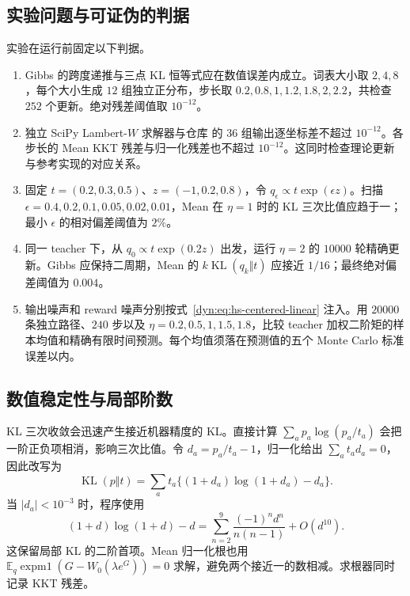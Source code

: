 \documentclass[lang=cn,scheme=chinese,openany]{../book/elegantbook}
\newcommand{\E}{\mathbb E}
\newcommand{\KL}{\operatorname{KL}}
\begin{document}
\subsection{实验问题与可证伪的判据}

实验在运行前固定以下判据。
\begin{enumerate}
 \item Gibbs 的跨度递推与三点 KL 恒等式应在数值误差内成立。词表大小取 $2,4,8$，每个大小生成 $12$ 组独立正分布，步长取 $0.2,0.8,1,1.2,1.8,2,2.2$，共检查 $252$ 个更新。绝对残差阈值取 $10^{-12}$。
 \item 独立 SciPy Lambert-$W$ 求解器与仓库  的 $36$ 组输出逐坐标差不超过 $10^{-12}$。各步长的 Mean KKT 残差与归一化残差也不超过 $10^{-12}$。这同时检查理论更新与参考实现的对应关系。
 \item 固定 $t=(0.2,0.3,0.5)$、$z=(-1,0.2,0.8)$，令 $q_\epsilon\propto t\exp(\epsilon z)$。扫描 $\epsilon=0.4,0.2,0.1,0.05,0.02,0.01$，Mean 在 $\eta=1$ 时的 KL 三次比值应趋于一；最小 $\epsilon$ 的相对偏差阈值为 $2\%$。
 \item 同一 teacher 下，从 $q_0\propto t\exp(0.2z)$ 出发，运行 $\eta=2$ 的 $10000$ 轮精确更新。Gibbs 应保持二周期，Mean 的 $k\KL(q_k\Vert t)$ 应接近 $1/16$；最终绝对偏差阈值为 $0.004$。
 \item 输出噪声和 reward 噪声分别按式~\eqref{dyn:eq:hs-centered-linear} 注入。用 $20000$ 条独立路径、$240$ 步以及 $\eta=0.2,0.5,1,1.5,1.8$，比较 teacher 加权二阶矩的样本均值和精确有限时间预测。每个均值须落在预测值的五个 Monte Carlo 标准误差以内。
\end{enumerate}

\subsection{数值稳定性与局部阶数}

KL 三次收敛会迅速产生接近机器精度的 KL。直接计算 $\sum_a p_a\log(p_a/t_a)$ 会把一阶正负项相消，影响三次比值。令 $d_a=p_a/t_a-1$，归一化给出 $\sum_a t_ad_a=0$，因此改写为
\begin{equation*}
 \KL(p\Vert t)=\sum_a t_a\{(1+d_a)\log(1+d_a)-d_a\}.
\end{equation*}
当 $|d_a|<10^{-3}$ 时，程序使用
\begin{equation*}
 (1+d)\log(1+d)-d
 =\sum_{n=2}^{9}\frac{(-1)^n d^n}{n(n-1)}+O(d^{10}).
\end{equation*}
这保留局部 KL 的二阶首项。Mean 归一化根也用 $\E_q\operatorname{expm1}(G-W_0(\lambda e^G))=0$ 求解，避免两个接近一的数相减。求根器同时记录 KKT 残差。
\end{document}
